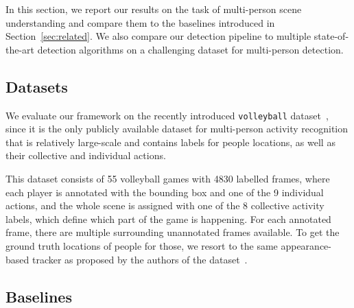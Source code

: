 \documentclass[10pt,twocolumn,letterpaper]{article}
\begin{document}
In this section, we report our results on the task of multi-person scene 
understanding and compare them to the baselines introduced in 
Section~\ref{sec:related}. We also compare our detection pipeline to 
multiple state-of-the-art detection algorithms on a challenging dataset
for multi-person detection.

\subsection{Datasets}

We evaluate our framework on the recently introduced \texttt{volleyball} 
dataset~\cite{Ibrahim2016}, since it is the only
publicly available dataset for multi-person activity recognition that is 
relatively large-scale and contains labels for people locations, as well 
as their collective and individual actions.

This dataset consists of 55 volleyball games with 4830 labelled frames, where
each player is annotated with the bounding box and one of the 9 individual actions,
and the whole scene is assigned with one of the 8 collective activity labels, which
define which part of the game is happening. For each
annotated frame, there are multiple surrounding unannotated frames available. To
get the ground truth locations of people for those, we resort to the same
appearance-based tracker as proposed by the authors of the dataset~\cite{Ibrahim2016}.







\subsection{Baselines}
\end{document}
